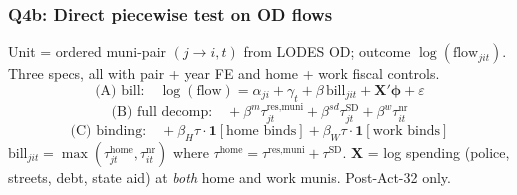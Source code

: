 \documentclass[xcolor = x11names, compress, aspectratio = 169]{beamer}
\renewcommand{\(}{\begin{columns}}
\renewcommand{\)}{\end{columns}}
\newcommand{\<}[1]{\begin{column}{#1}}
\renewcommand{\>}{\end{column}}
\begin{document}
\fi %

\iffalse %
\begin{frame}
\frametitle{Q4b: Direct piecewise test on OD flows}
    Unit = ordered muni-pair $(j \to i, t)$ from LODES OD; outcome
    $\log(\text{flow}_{jit})$. Three specs, all with pair + year FE
    and home + work fiscal controls.
    \[
    \text{(A) bill:}\quad \log(\text{flow}) = \alpha_{ji} + \gamma_t + \beta\,\text{bill}_{jit} + \mathbf{X}'\boldsymbol{\phi} + \varepsilon
    \]
    \[
    \text{(B) full decomp:}\quad + \beta^{m} \tau^{\text{res,muni}}_{jt} + \beta^{sd} \tau^{\text{SD}}_{jt} + \beta^{w} \tau^{\text{nr}}_{it}
    \]
    \[
    \text{(C) binding:}\quad + \beta_H \tau \cdot \mathbf{1}[\text{home binds}] + \beta_W \tau \cdot \mathbf{1}[\text{work binds}]
    \]
    \footnotesize
    $\text{bill}_{jit} = \max(\tau^{\text{home}}_{jt}, \tau^{\text{nr}}_{it})$
    where $\tau^{\text{home}} = \tau^{\text{res,muni}} + \tau^{\text{SD}}$.
    $\mathbf{X}$ = log spending (police, streets, debt, state aid) at
    \emph{both} home and work munis. Post-Act-32 only.
\end{frame}
\end{document}
